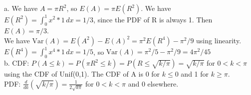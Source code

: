 a. We have \(A = \pi R^{2}\), so \(E(A) = \pi E(R^{2})\). We have \(E(R^{2}) = \int_{0}^{1} x^{2}*1\,dx = 1/3\), since the PDF of R is always 1. Then \(E(A) = \pi/3\). \\

We have \(\mathrm{Var}(A) = E(A^{2}) - E(A)^{2} = \pi^{2}E(R^{4}) - \pi^{2}/9\) using linearity. \(E(R^{4}) = \int_{0}^{1} x^{4}*1\,dx = 1/5\), so \(\mathrm{Var}(A) = \pi^{2}/5 - \pi^{2}/9 = 4\pi^{2}/45\)\\

b. CDF: \(P(A \le k) = P(\pi R^{2} \le k) = P(R \le \sqrt{k/\pi}) = \sqrt{k/\pi}\) for \(0<k<\pi\) using the CDF of Unif(0,1). The CDF of A is 0 for \(k \le 0\) and 1 for \(k \ge \pi\).  \\

PDF: \(\frac{d}{dk}(\sqrt{k/\pi}) = \frac{1}{2\sqrt{k\pi}}\) for \(0<k<\pi\) and 0 elsewhere.
